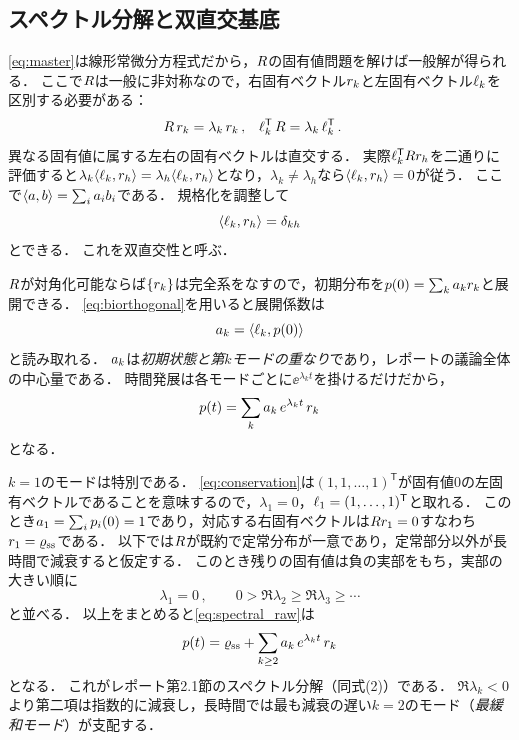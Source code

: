 \documentclass[a4paper,11pt,onecolumn]{jlreq}
\begin{document}
\subsection{スペクトル分解と双直交基底}
\label{sec:markov_spectral}

\eqref{eq:master}は線形常微分方程式だから，$R$の固有値問題を解けば一般解が得られる．
ここで$R$は一般に非対称なので，右固有ベクトル$r_{k}$と左固有ベクトル$\ell_{k}$を区別する必要がある：
\begin{align}
  R\,r_{k} &= \lambda_k\,r_{k}\,, &
  \ell_{k}^{\mathsf{T}}\,R &= \lambda_k\,\ell_{k}^{\mathsf{T}}\,.
  \label{eq:lr_eigen}
\end{align}
異なる固有値に属する左右の固有ベクトルは直交する．
実際$\ell_{k}^{\mathsf{T}}Rr_{h}$を二通りに評価すると$\lambda_k\langle \ell_{k} , r_{h} \rangle=\lambda_h\langle \ell_{k} , r_{h} \rangle$となり，$\lambda_k\neq\lambda_h$なら$\langle \ell_{k} , r_{h} \rangle=0$が従う．
ここで$\langle a , b \rangle=\sum_i a_i b_i$である．
規格化を調整して
\begin{equation}
  \langle \ell_{k} , r_{h} \rangle = \delta_{kh}
  \label{eq:biorthogonal}
\end{equation}
とできる．
これを双直交性と呼ぶ．

$R$が対角化可能ならば$\{r_{k}\}$は完全系をなすので，初期分布を$p(0)=\sum_k a_{k}r_{k}$と展開できる．
\eqref{eq:biorthogonal}を用いると展開係数は
\begin{equation}
  a_{k} = \langle \ell_{k} , p(0) \rangle
  \label{eq:overlap}
\end{equation}
と読み取れる．
$a_{k}$は\emph{初期状態と第$k$モードの重なり}であり，レポートの議論全体の中心量である．
時間発展は各モードごとに$\ee^{\lambda_k t}$を掛けるだけだから，
\begin{equation}
  p(t) = \sum_k a_{k}\,e^{\lambda_k t}\,r_{k}
  \label{eq:spectral_raw}
\end{equation}
となる．

$k=1$のモードは特別である．
\eqref{eq:conservation}は$(1,1,\dots,1)^{\mathsf{T}}$が固有値$0$の左固有ベクトルであることを意味するので，$\lambda_1=0$，$\ell_{1}=(1,\dots,1)^{\mathsf{T}}$と取れる．
このとき$a_{1}=\sum_i p_i(0)=1$であり，対応する右固有ベクトルは$Rr_{1}=0$すなわち$r_{1}=\varrho_{\mathrm{ss}}$である．
以下では$R$が既約で定常分布が一意であり，定常部分以外が長時間で減衰すると仮定する．
このとき残りの固有値は負の実部をもち，実部の大きい順に
\begin{equation}
  \lambda_1 = 0\,,\qquad 0>\Re\lambda_2\ge\Re\lambda_3\ge\cdots
  \label{eq:ordering}
\end{equation}
と並べる．
以上をまとめると\eqref{eq:spectral_raw}は
\begin{equation}
  p(t) = \varrho_{\mathrm{ss}} + \sum_{k\ge2}a_{k}\,e^{\lambda_k t}\,r_{k}
  \label{eq:spectral}
\end{equation}
となる．
これがレポート第2.1節のスペクトル分解（同式(2)）である．
$\Re\lambda_k<0$より第二項は指数的に減衰し，長時間では最も減衰の遅い$k=2$のモード（\emph{最緩和モード}）が支配する．
\end{document}
